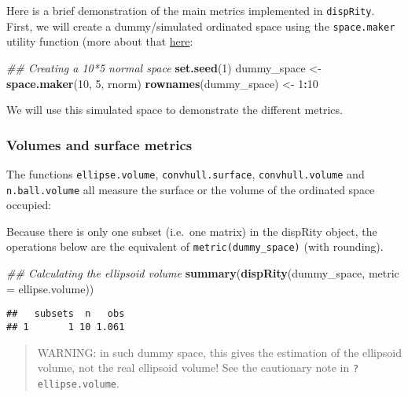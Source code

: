 \documentclass[
]{book}
\newenvironment{Shaded}{\begin{snugshade}}{\end{snugshade}}
\newcommand{\CommentTok}[1]{\textcolor[rgb]{0.56,0.35,0.01}{\textit{#1}}}
\newcommand{\DataTypeTok}[1]{\textcolor[rgb]{0.13,0.29,0.53}{#1}}
\newcommand{\DecValTok}[1]{\textcolor[rgb]{0.00,0.00,0.81}{#1}}
\newcommand{\KeywordTok}[1]{\textcolor[rgb]{0.13,0.29,0.53}{\textbf{#1}}}
\newcommand{\NormalTok}[1]{#1}
\newcommand{\OperatorTok}[1]{\textcolor[rgb]{0.81,0.36,0.00}{\textbf{#1}}}
\newcommand{\StringTok}[1]{\textcolor[rgb]{0.31,0.60,0.02}{#1}}
\begin{document}
Here is a brief demonstration of the main metrics implemented in \texttt{dispRity}.
First, we will create a dummy/simulated ordinated space using the \texttt{space.maker} utility function (more about that \protect\hyperlink{space.maker}{here}:

\begin{Shaded}
\begin{Highlighting}[]
\CommentTok{\#\# Creating a 10*5 normal space}
\KeywordTok{set.seed}\NormalTok{(}\DecValTok{1}\NormalTok{)}
\NormalTok{dummy\_space \textless{}{-}}\StringTok{ }\KeywordTok{space.maker}\NormalTok{(}\DecValTok{10}\NormalTok{, }\DecValTok{5}\NormalTok{, rnorm)}
\KeywordTok{rownames}\NormalTok{(dummy\_space) \textless{}{-}}\StringTok{ }\DecValTok{1}\OperatorTok{:}\DecValTok{10}
\end{Highlighting}
\end{Shaded}

We will use this simulated space to demonstrate the different metrics.

\hypertarget{volumes-and-surface-metrics}{%
\subsubsection{Volumes and surface metrics}\label{volumes-and-surface-metrics}}

The functions \texttt{ellipse.volume}, \texttt{convhull.surface}, \texttt{convhull.volume} and \texttt{n.ball.volume} all measure the surface or the volume of the ordinated space occupied:

Because there is only one subset (i.e.~one matrix) in the dispRity object, the operations below are the equivalent of \texttt{metric(dummy\_space)} (with rounding).

\begin{Shaded}
\begin{Highlighting}[]
\CommentTok{\#\# Calculating the ellipsoid volume}
\KeywordTok{summary}\NormalTok{(}\KeywordTok{dispRity}\NormalTok{(dummy\_space, }\DataTypeTok{metric =}\NormalTok{ ellipse.volume))}
\end{Highlighting}
\end{Shaded}

\begin{verbatim}
##   subsets  n   obs
## 1       1 10 1.061
\end{verbatim}

\begin{quote}
WARNING: in such dummy space, this gives the estimation of the ellipsoid volume, not the real ellipsoid volume! See the cautionary note in \texttt{?ellipse.volume}.
\end{quote}
\end{document}
